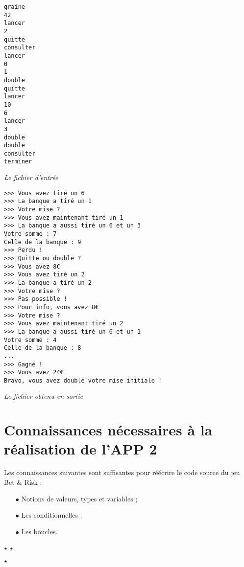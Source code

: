 \documentclass{article}
\begin{document}
\begin{multicols}{2}
\begin{verbatim}
graine
42
lancer
2
quitte
consulter
lancer
0
1
double
quitte
lancer
10
6
lancer
3
double
double
consulter
terminer

\end{verbatim}

\begin{center}
	\phantom{Bravo, vous avez doublé votre mise initiale !}
	\textit{Le fichier d'entrée}
	\phantom{Bravo, vous avez doublé votre mise initiale !}
	\phantom{Bravo, vous avez doublé votre mise initiale !}
	\phantom{Bravo, vous avez doublé votre mise initiale !}
	\phantom{Bravo, vous avez doublé votre mise initiale !}
\end{center}


\begin{verbatim}
>>> Vous avez tiré un 6
>>> La banque a tiré un 1
>>> Votre mise ?
>>> Vous avez maintenant tiré un 1
>>> La banque a aussi tiré un 6 et un 3
Votre somme : 7
Celle de la banque : 9
>>> Perdu !
>>> Quitte ou double ?
>>> Vous avez 8€
>>> Vous avez tiré un 2
>>> La banque a tiré un 2
>>> Votre mise ?
>>> Pas possible !
>>> Pour info, vous avez 8€
>>> Votre mise ?
>>> Vous avez maintenant tiré un 2
>>> La banque a aussi tiré un 6 et un 1
Votre somme : 4
Celle de la banque : 8
...
>>> Gagné !
>>> Vous avez 24€
Bravo, vous avez doublé votre mise initiale !
\end{verbatim}

\begin{center}
	\phantom{Bravo, vous avez doublé votre mise initiale !}
	\textit{Le fichier obtenu en sortie}
	\phantom{Bravo, vous avez doublé votre mise initiale !}
\end{center}
\end{multicols}

\newpage

\section{Connaissances nécessaires à la réalisation de l'APP 2 }

Les connaissances suivantes sont suffisantes pour réécrire le code source du jeu Bet \& Risk :

\bigskip

\begin{itemize}
	\item[$\bullet$]	Notions de valeurs, types et variables ;
	\item[]
	\item[$\bullet$] Les conditionnelles ;
	\item[]
	\item[$\bullet$] Les boucles.
\end{itemize}

\bigskip
\null
\bigskip

\begin{center}
	$\star$ \hspace{2cm} $\star$
	
	\bigskip
	\null
	\bigskip

	$\star$
\end{center}
\end{document}
